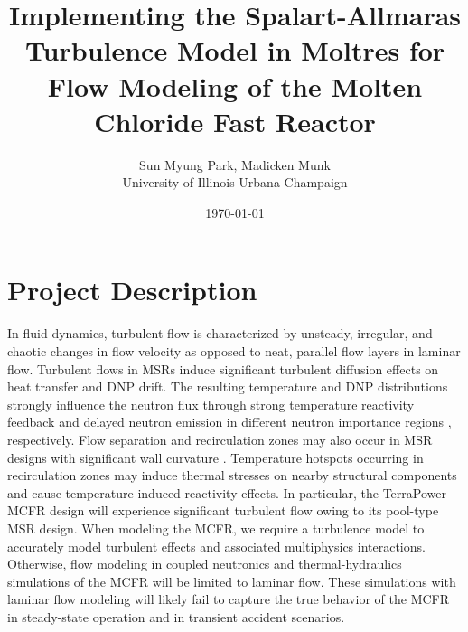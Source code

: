 \documentclass[letterpaper,11pt]{article}
\begin{document}
%
\title{Implementing the Spalart-Allmaras Turbulence Model in Moltres for Flow Modeling of the
Molten Chloride Fast Reactor}
\author{Sun Myung Park, Madicken Munk\\University of Illinois Urbana-Champaign}
\date{\today}
%
\maketitle
%
\section*{Project Description}

In fluid dynamics, turbulent flow is characterized by unsteady, irregular, and chaotic changes in
flow velocity as opposed to neat, parallel flow layers in laminar flow. Turbulent flows in
\glspl{MSR} induce significant turbulent diffusion effects on heat transfer and \gls{DNP} drift.
The resulting temperature and \gls{DNP} distributions strongly influence the neutron flux through
strong temperature reactivity feedback and delayed neutron emission in different neutron importance
regions \cite{pazsit_5_2017}, respectively. Flow separation and recirculation zones may also occur
in \gls{MSR} designs with significant wall curvature \cite{fiorina_modelling_2014}. Temperature
hotspots occurring in recirculation zones may induce thermal stresses on nearby structural
components and cause temperature-induced reactivity effects. In particular, the TerraPower
\gls{MCFR} design will experience significant turbulent flow owing to its
pool-type \gls{MSR} design. When modeling the \gls{MCFR}, we require a turbulence model to
accurately model turbulent effects and associated multiphysics interactions. Otherwise, flow
modeling in coupled neutronics and thermal-hydraulics simulations of the \gls{MCFR} will be limited
to laminar flow. These simulations with laminar flow modeling will likely fail to capture the true
behavior of the \gls{MCFR} in steady-state operation and in transient accident scenarios.
\end{document}
